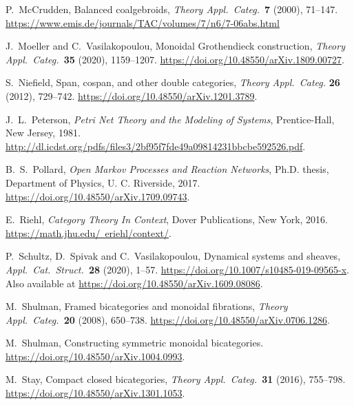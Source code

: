 \documentclass[a4paper,onecolumn, superscriptaddress,10pt, accepted=2022-03-25, issue=SS, volume=VV, shorttitle=papers/compositionality-VV-SS]{compositionalityarticle}
\begin{document}
\begin{thebibliography}{100}
 P.\ McCrudden, Balanced coalgebroids, \textsl{Theory Appl.\ Categ.\ }\textbf{7} (2000), 71--147.  \hfill  \break
 \href{https://www.emis.de/journals/TAC/volumes/7/n6/7-06abs.html}{https://www.emis.de/journals/TAC/volumes/7/n6/7-06abs.html}

 J.\ Moeller and C.\ Vasilakopoulou, Monoidal Grothendieck construction, \textsl{Theory Appl.\ Categ.\ }\textbf{35} (2020), 1159--1207.  \href{https://doi.org/10.48550/arXiv.1809.00727}{https://doi.org/10.48550/arXiv.1809.00727}.

 S.~Niefield, Span, cospan, and other double categories, \textsl{Theory Appl.\ Categ.} \textbf{26} (2012), 729--742.  \href{https://doi.org/10.48550/arXiv.1201.3789}{https://doi.org/10.48550/arXiv.1201.3789}.

 J.\ L.\ Peterson, \textit{Petri Net Theory and the Modeling of Systems}, Prentice-Hall, New Jersey, 1981. \href{http://dl.icdst.org/pdfs/files3/2bf95f7fde49a09814231bbcbe592526.pdf}{http://dl.icdst.org/pdfs/files3/2bf95f7fde49a09814231bbcbe592526.pdf}.

 B.\ S.\ Pollard, \textsl{Open Markov Processes and Reaction Networks}, Ph.D. thesis, Department of Physics, U. C. Riverside, 2017. \href{https://doi.org/10.48550/arXiv.1709.09743}{https://doi.org/10.48550/arXiv.1709.09743}.

 E.\ Riehl, \textsl{Category Theory In Context}, Dover Publications, New York, 2016.  \href{https://math.jhu.edu/~eriehl/context/}{https://math.jhu.edu/~eriehl/context/}.

 P.\ Schultz, D.\ Spivak and C.\ Vasilakopoulou, Dynamical systems and sheaves, \textsl{Appl.\ Cat.\ Struct.\ }\textbf{28} (2020), 1--57. 
\href{https://doi.org/10.1007/s10485-019-09565-x}{https://doi.org/10.1007/s10485-019-09565-x}.  Also available at \href{https://doi.org/10.48550/arXiv.1609.08086}{https://doi.org/10.48550/arXiv.1609.08086}.

 M.\ Shulman, Framed bicategories and monoidal fibrations, \textsl{Theory Appl.\ Categ.\ }\textbf{20} (2008), 650--738.  \href{https://doi.org/10.48550/arXiv.0706.1286}{https://doi.org/10.48550/arXiv.0706.1286}.

 M.\ Shulman, Constructing symmetric monoidal bicategories. \hfill \break
\href{https://doi.org/10.48550/arXiv.1004.0993}{https://doi.org/10.48550/arXiv.1004.0993}.

 M.\ Stay, Compact closed bicategories, \textsl{Theory Appl.\ Categ.\ }\textbf{31} (2016), 755--798.   \hfill \break \href{https://doi.org/10.48550/arXiv.1301.1053}{https://doi.org/10.48550/arXiv.1301.1053}.


\end{thebibliography}
\end{document}

